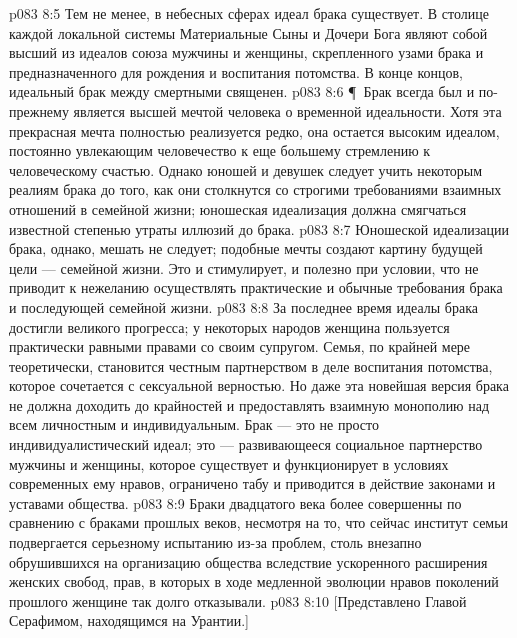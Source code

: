 \vs p083 8:5 Тем не менее, в небесных сферах идеал брака существует. В столице каждой локальной системы Материальные Сыны и Дочери Бога являют собой высший из идеалов союза мужчины и женщины, скрепленного узами брака и предназначенного для рождения и воспитания потомства. В конце концов, идеальный брак между смертными  священен.
\vs p083 8:6 \P\ Брак всегда был и по\hyp{}прежнему является высшей мечтой человека о временной идеальности. Хотя эта прекрасная мечта полностью реализуется редко, она остается высоким идеалом, постоянно увлекающим человечество к еще большему стремлению к человеческому счастью. Однако юношей и девушек следует учить некоторым реалиям брака до того, как они столкнутся со строгими требованиями взаимных отношений в семейной жизни; юношеская идеализация должна смягчаться известной степенью утраты иллюзий до брака.
\vs p083 8:7 Юношеской идеализации брака, однако, мешать не следует; подобные мечты создают картину будущей цели --- семейной жизни. Это и стимулирует, и полезно при условии, что не приводит к нежеланию осуществлять практические и обычные требования брака и последующей семейной жизни.
\vs p083 8:8 За последнее время идеалы брака достигли великого прогресса; у некоторых народов женщина пользуется практически равными правами со своим супругом. Семья, по крайней мере теоретически, становится честным партнерством в деле воспитания потомства, которое сочетается с сексуальной верностью. Но даже эта новейшая версия брака не должна доходить до крайностей и предоставлять взаимную монополию над всем личностным и индивидуальным. Брак --- это не просто индивидуалистический идеал; это --- развивающееся социальное партнерство мужчины и женщины, которое существует и функционирует в условиях современных ему нравов, ограничено табу и приводится в действие законами и уставами общества.
\vs p083 8:9 Браки двадцатого века более совершенны по сравнению с браками прошлых веков, несмотря на то, что сейчас институт семьи подвергается серьезному испытанию из\hyp{}за проблем, столь внезапно обрушившихся на организацию общества вследствие ускоренного расширения женских свобод, прав, в которых в ходе медленной эволюции нравов поколений прошлого женщине так долго отказывали.
\vs p083 8:10 [Представлено Главой Серафимом, находящимся на Урантии.]
